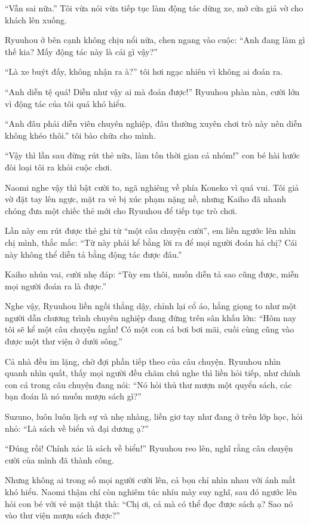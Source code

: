 ﻿\documentclass[../main.tex]{subfiles}
\begin{document}
``Vẫn sai nữa.'' Tôi vừa nói vừa tiếp tục làm động tác dừng xe, mở cửa giả vờ cho khách lên xuống.

Ryuuhou ở bên cạnh không chịu nổi nữa, chen ngang vào cuộc: ``Anh đang làm gì thế kia? Mấy động tác này là cái gì vậy?''

``Là xe buýt đấy, không nhận ra à?'' tôi hơi ngạc nhiên vì không ai đoán ra.

``Anh diễn tệ quá! Diễn như vậy ai mà đoán được!'' Ryuuhou phàn nàn, cười lớn vì động tác của tôi quá khó hiểu.

``Anh đâu phải diễn viên chuyên nghiệp, đâu thường xuyên chơi trò này nên diễn không khéo thôi.'' tôi bào chữa cho mình.

``Vậy thì lần sau đừng rút thẻ nữa, làm tốn thời gian cả nhóm!'' con bé hài hước đòi loại tôi ra khỏi cuộc chơi.

Naomi nghe vậy thì bật cười to, ngã nghiêng về phía Koneko vì quá vui. Tôi giả vờ đặt tay lên ngực, mặt ra vẻ bị xúc phạm nặng nề, nhưng Kaiho đã nhanh chóng đưa một chiếc thẻ mới cho Ryuuhou để tiếp tục trò chơi.

Lần này em rút được thẻ ghi từ ``một câu chuyện cười'', em liền ngước lên nhìn chị mình, thắc mắc: ``Từ này phải kể bằng lời ra để mọi người đoán hả chị? Cái này không thể diễn tả bằng động tác được đâu.''

Kaiho nhún vai, cười nhẹ đáp: ``Tùy em thôi, muốn diễn tả sao cũng được, miễn mọi người đoán ra là được.''

Nghe vậy, Ryuuhou liền ngồi thẳng dậy, chỉnh lại cổ áo, hắng giọng to như một người dẫn chương trình chuyên nghiệp đang đứng trên sân khấu lớn: ``Hôm nay tôi sẽ kể một câu chuyện ngắn! Có một con cá bơi bơi mãi, cuối cùng cũng vào được một thư viện ở dưới sông.''

Cả nhà đều im lặng, chờ đợi phần tiếp theo của câu chuyện. Ryuuhou nhìn quanh nhìn quất, thấy mọi người đều chăm chú nghe thì liền hỏi tiếp, như chính con cá trong câu chuyện đang nói: ``Nó hỏi thủ thư mượn một quyển sách, các bạn đoán là nó muốn mượn sách gì?''

Suzuno, luôn luôn lịch sự và nhẹ nhàng, liền giơ tay như đang ở trên lớp học, hỏi nhỏ: ``Là sách về biển và đại dương ạ?''

``Đúng rồi! Chính xác là sách về biển!'' Ryuuhou reo lên, nghĩ rằng câu chuyện cười của mình đã thành công.

Nhưng không ai trong số mọi người cười lên, cả bọn chỉ nhìn nhau với ánh mắt khó hiểu. Naomi thậm chí còn nghiêm túc nhíu mày suy nghĩ, sau đó ngước lên hỏi con bé với vẻ mặt thật thà: ``Chị ơi, cá mà có thể đọc được sách ạ? Sao nó vào thư viện mượn sách được?''
\end{document}
